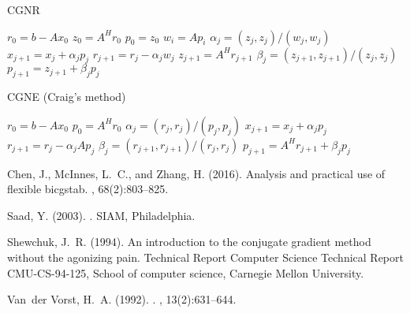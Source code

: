 \documentclass[10pt]{article}
\begin{document}
\begin{algorithm}[H]
  \caption{CGNR \citep[algorithm 8.4]{Saad_2003_IMS}}
  \begin{algorithmic}[1]
    \State $r_0=b-Ax_0$
    \State $z_0 = A^H r_0$
    \State $p_0=z_0$
    \State $w_i=Ap_i$
    \State $\alpha_j = (z_j,z_j)/(w_j,w_j)$
    \State $x_{j+1} = x_j + \alpha_j  p_j$
    \State $r_{j+1} = r_j-\alpha_j w_j$
    \State $z_{j+1}=A^H r_{j+1}$
    \State $\beta_j = (z_{j+1},z_{j+1})/(z_j,z_j)$
    \State $p_{j+1}=z_{j+1}+\beta_jp_j$
    \EndFor
  \end{algorithmic}
\end{algorithm}

\begin{algorithm}[H]
  \caption{CGNE (Craig's method) \citep[algorithm 8.5]{Saad_2003_IMS}}
  \begin{algorithmic}[1]
    \State $r_0=b-Ax_0$
    \State $p_0 = A^H r_0$
    \State $\alpha_j = (r_j , r_j)/(p_j, p_j )$
    \State $x_{j+1} = x_j + \alpha_j  p_j$
    \State $r_{j+1} = r_j-\alpha_j Ap_j$
    \State $\beta_j = (r_{j+1},r_{j+1})/(r_j,r_j)$
    \State $p_{j+1}=A^H r_{j+1}+\beta_jp_j$
    \EndFor
  \end{algorithmic}
\end{algorithm}


\newpage

%
\newcommand{\SortNoop}[1]{}
\begin{thebibliography}{}

Chen, J., McInnes, L.~C., and Zhang, H. (2016).
\newblock Analysis and practical use of flexible bicgstab.
, 68(2):803--825.

Saad, Y. (2003).
.
\newblock SIAM, Philadelphia.

Shewchuk, J.~R. (1994).
\newblock An introduction to the conjugate gradient method without the
  agonizing pain.
\newblock Technical Report Computer Science Technical Report CMU-CS-94-125,
  School of computer science, Carnegie Mellon University.

Van~der Vorst, H.~A. (1992).
.
,
  13(2):631--644.

\end{thebibliography}
\end{document}
